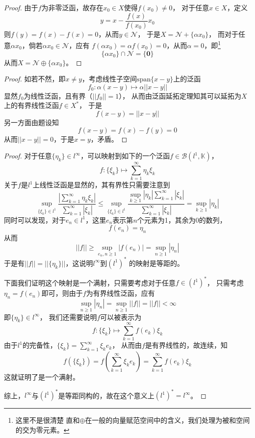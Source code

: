\documentclass[cn]{homework}
\begin{document}
    \problem
    \begin{proof}
        由于$f$为非零泛函，故存在$x_0\in X$使得$f(x_0)\neq 0$，
        对于任意$x\in X$，定义
        \[y=x-\frac{f(x)}{f(x_0)}x_0\]
        则$f(y)=f(x)-f(x)=0$，从而$y\in\mathscr N$，
        于是$X=\mathscr N+\{\alpha x_0\}$，
        而对于任意$\alpha x_0$，倘若$\alpha x_0\in\mathscr N$，应有
        $f(\alpha x_0)=\alpha f(x_0)=0$，从而$\alpha=0$，即\footnote{这里不是很清楚
        直和$\oplus$在一般的向量赋范空间中的含义，我们处理为被和空间的交为零元素。}
        \[\{\alpha x_0\}\cap\mathscr N=\{\boldsymbol 0\}\]
        从而$X=\mathscr N\oplus\{\alpha x_0\}$。
    \end{proof}

    \problem
    \begin{proof}
        如若不然，即$x\neq y$，考虑线性子空间$\mathrm{span}\{x-y\}$上的泛函
        \[f_0:\alpha(x-y)\mapsto\alpha||x-y||\]
        显然$f_0$为线性泛函，且有界（$||f_0||=1$），
        从而由泛函延拓定理知其可以延拓为$X$上的有界线性泛函$f\in X^*$，
        于是
        \[f(x-y)=||x-y||\]
        另一方面由题设知
        \[f(x-y)=f(x)-f(y)=0\]
        从而$||x-y||=0$，于是$x=y$，矛盾。
    \end{proof}

    \problem
    \begin{proof}
        对于任意$\{\eta_k\}\in l^\infty$，可以映射到如下的一个泛函$f\in\mathscr B(l^1,\mathbb K)$，
        \[f:\{\xi_k\}\mapsto\sum_{k=1}^\infty\eta_k\xi_k\]
        关于$f$是$l^1$上线性泛函是显然的，其有界性只需要注意到
        \[\sup_{\{\xi_k\}\in l^1}
        \frac{\left|\sum_{k=1}^\infty\eta_k\xi_k\right|}
        {\sum_{k=1}^\infty|\xi_k|}
        \leq\sup_{\{\xi_k\}\in l^1}
        \frac{\sup_{k\geq 1}|\eta_k|\sum_{k=1}^\infty|\xi_k|}{\sum_{k=1}^\infty|\xi_k|}
        =\sup_{k\geq 1}|\eta_k|\]
        同时可以发现，对于$e_n\in l^1$，这里$e_n$表示第$n$个元素为1，其余为0的数列，
        \[f(e_n)=\eta_n\]
        从而
        \[||f||\geq\sup_{e_n,n\geq 1}|f(e_n)|=\sup_{n\geq 1}|\eta_n|\]
        于是有$||f||=||\{\eta_k\}||$，这说明$l^\infty$到$(l^1)^*$
        的映射是等距的。

        下面我们证明这个映射是一个满射，只需要考虑对于任意$f\in(l^1)^*$，
        只需考虑$\eta_n=f(e_n)$即可，则由于$f$为有界线性泛函，应有
        \[\sup_{n\geq 1}|\eta_n|=\sup_{n\geq 1}||f||=||f||<\infty\]
        即$\{\eta_k\}\in l^\infty$，
        我们还需要说明$f$可以被表示为
        \[f:\{\xi_k\}\mapsto\sum_{k=1}^\infty f(e_k)\xi_k\]
        由于$l^1$的完备性，$\{\xi_k\}=\sum_{k=1}^\infty \xi_ke_k$，
        从而由$f$是有界线性的，故连续，知
        \[f(\{\xi_k\})=f(\sum_{k=1}^\infty\xi_ke_k)=\sum_{k=1}^\infty f(e_k)\xi_k\]
        这就证明了是一个满射。

        综上，$l^\infty$与$(l^1)^*$是等距同构的，故在这个意义上$(l^1)^*=l^\infty$。
    \end{proof}
\end{document}
